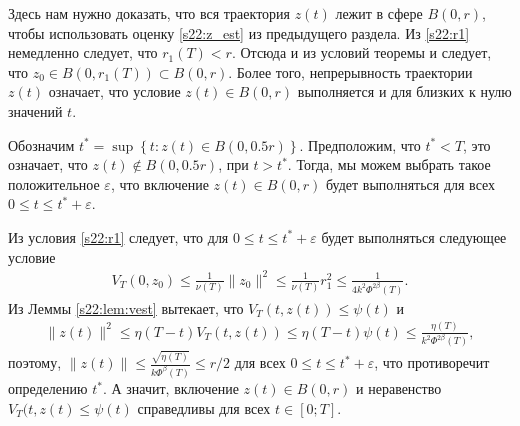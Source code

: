 \documentclass[../main.tex]{subfiles}
\begin{document}
Здесь нам нужно доказать, что вся траектория $z(t)$ лежит в сфере $B(0,r)$, чтобы использовать оценку \eqref{s22:z_est} из предыдущего раздела. 
Из \eqref{s22:r1} немедленно следует, что $r_1(T) < r$. 
Отсюда и из условий теоремы и следует, что $z_0 \in B(0,r_1(T)) \subset B(0,r) $. 
Более того, непрерывность траектории $z(t)$ означает, что условие $z(t) \in B(0,r) $ выполняется и для близких к нулю значений $t$. 

Обозначим $t^* = \sup \left\{ t: z(t) \in B\left(0,0.5r\right)\right\} $.
Предположим, что $t^* < T$, это означает, что $z(t) \notin B(0,0.5r)$, при $t > t^*$. 
Тогда, мы можем выбрать такое положительное $ \varepsilon$, что включение $z(t) \in B(0,r)$ будет выполняться для всех $0 \leqslant t \leqslant t^* + \varepsilon$. 

Из условия \eqref{s22:r1} следует, что для $0 \leqslant t \leqslant t^* + \varepsilon$ будет выполняться следующее условие
\begin{gather*}
 V_T(0,z_0) \leqslant \frac{1}{\nu(T)} \|z_0\|^2 \leqslant \frac{1}{\nu(T)} r_1^2 \leqslant \frac{1}{4k^2\Phi^{2\beta}(T)}.
\end{gather*}
Из Леммы \ref{s22:lem:vest} вытекает, что 
$V_T(t, z(t)) \leqslant \psi(t) $ и
\begin{gather}\label{s22:z_est}
 \|z(t)\|^2 \leqslant \eta(T-t) V_T(t,z(t)) \leqslant \eta(T-t) \psi(t) \leqslant \frac{\eta(T)}{k^2\Phi^{2\beta}(T)},
\end{gather}
поэтому, $\|z(t)\| \leqslant \frac{\sqrt{\eta(T)}}{k\Phi^\beta(T)} \leqslant r/2$ для всех $0\leqslant t \leqslant t^*+\varepsilon$,
что противоречит определению $t^*$. 
А значит, включение $z(t) \in B(0,r) $ и неравенство $V_T(t,z(t)\leqslant \psi(t)$ справедливы для всех $t \in [0; T]$.
 
\end{document}
